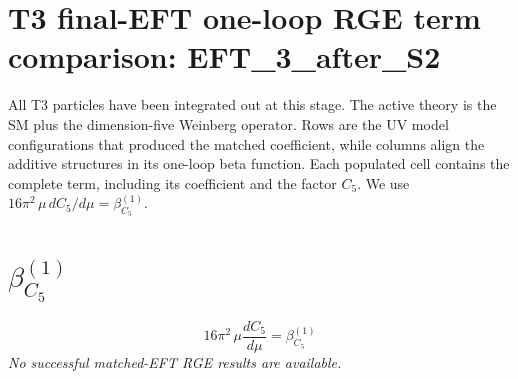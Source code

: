 \documentclass[8pt]{article}
\begin{document}
\begin{landscape}
\section*{T3 final-EFT one-loop RGE term comparison: EFT\_3\_after\_S2}
All T3 particles have been integrated out at this stage. The active theory is the SM plus the dimension-five Weinberg operator. Rows are the UV model configurations that produced the matched coefficient, while columns align the additive structures in its one-loop beta function. Each populated cell contains the complete term, including its coefficient and the factor $C_5$.
\medskip
We use $16\pi^2\,\mu\,dC_5/d\mu=\beta_{C_5}^{(1)}$.
\section*{$\beta_{C_5}^{(1)}$}
\[16\pi^2\,\mu\frac{dC_5}{d\mu}=\beta_{C_5}^{(1)}\]
\textit{No successful matched-EFT RGE results are available.}
\end{landscape}
\end{document}
